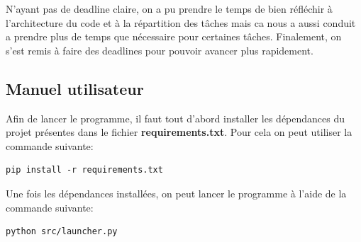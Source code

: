 \documentclass[french,a4paper,10pt,twocolumn]{article}
\begin{document}
N'ayant pas de deadline claire, on a pu prendre le temps de bien réfléchir à l'architecture du code et à la répartition des tâches mais 
ca nous a aussi conduit a prendre plus de temps que nécessaire pour certaines tâches.
Finalement, on s'est remis à faire des deadlines pour pouvoir avancer plus rapidement.



\subsection{Manuel utilisateur}

Afin de lancer le programme, il faut tout d'abord installer les dépendances du projet présentes dans le fichier \textbf{requirements.txt}.
Pour cela on peut utiliser la commande suivante:
\begin{lstlisting}[style=bash]
    pip install -r requirements.txt
\end{lstlisting}


Une fois les dépendances installées, on peut lancer le programme à l'aide de la commande suivante:
\begin{lstlisting}[style=bash]
    python src/launcher.py
\end{lstlisting}


\printbibliography
\end{document}
